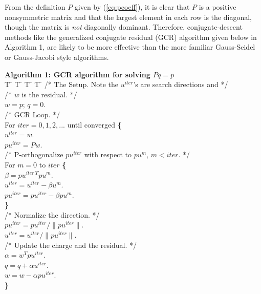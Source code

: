From the definition $ P $ given by   (\ref{eq:pcoeff}), it is clear
that $ P $ is a positive nonsymmetric matrix and that the largest
element in each row is the diagonal, though the matrix is {\it not }
diagonally dominant.  Therefore, conjugate-descent methods like the
generalized conjugate residual (GCR) algorithm  \cite{saa} given below
in Algorithm 1, are  likely to be more effective than the more familiar
Gauss-Seidel or Gauss-Jacobi style algorithms.
\begin{tabbing}
{\bf Algorithm 1: GCR algorithm for solving $ Pq = p $}\\[0.2in]
T \= \kill
\>T \= \kill
\>\>T \= \kill
\>\>\>T \= \kill
\> /* The Setup. Note the $ u^{iter}$'s are search directions and */ \\
\> /* $ w $ is the residual. */\\
\> \> $w = p$; $q = 0$.\\
\> /* GCR Loop. */ \\
\> For $ iter = 0, 1, 2, ... $ until converged {\bf \{ }\\
\> \> $ u^{iter} = w $. \\
\> \> $ pu^{iter} = P w $.\\
\> \> /* P-orthogonalize $pu^{iter}$ with respect to $pu^m$, $ m < iter $. */\\
\> \> For $ m = 0 $ to  $ iter $ {\bf \{ }\\
\> \> \> $ \beta = pu^{iter\: T}pu^m $.\\
\> \> \> $ u^{iter} = u^{iter} - \beta u^m $.\\
\> \> \> $ pu^{iter} = pu^{iter} - \beta pu^m $.\\
\> \> {\bf \} }\\
\> \> /* Normalize the direction. */\\	
\> \> $ pu^{iter} = pu^{iter}/\|pu^{iter}\| $.\\
\> \> $ u^{iter} = u^{iter}/\|pu^{iter}\| $.\\
\> \> /* Update the charge and the residual. */	\\
\> \> $ \alpha = w^Tpu^{iter} $.\\
\> \> $ q = q + \alpha u^{iter} $.\\
\> \> $ w = w - \alpha pu^{iter} $.\\
\> {\bf \} }\\
\end{tabbing}
